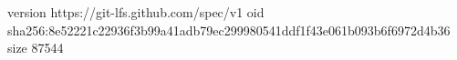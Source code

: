 version https://git-lfs.github.com/spec/v1
oid sha256:8e52221c22936f3b99a41adb79ec299980541ddf1f43e061b093b6f6972d4b36
size 87544
